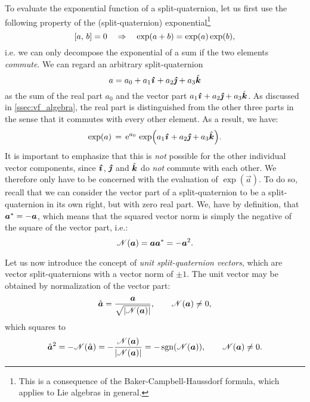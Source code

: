 To evaluate the exponential function of a split-quaternion, let us first use the following property of the (split-quaternion) exponential\footnote{This is a consequence of the Baker-Campbell-Haussdorf formula, which applies to Lie algebras in general.} \cite{Hall2013}
\begin{equation}
    \liebr{a}{b} = 0 \quad \Rightarrow \quad \exp(a + b) = \exp(a)\exp(b),
\end{equation}
i.e. we can only decompose the exponential of a sum if the two elements \emph{commute}. We can regard an arbitrary split-quaternion
\begin{equation}
     a = \quat{a_0}{a_1}{a_2}{a_3}
\end{equation}
as the sum of the real part \(a_0\) and the vector part \(\quatvec{a_1}{a_2}{a_3}\). As discussed in \cref{ssec:vf_algebra}, the real part is distinguished from the other three parts in the sense that it commutes with every other element. As a result, we have:
\begin{equation}
     \exp(a) \, = \,\ec^{a_0}\,\exp(\quatvec{a_1}{a_2}{a_3}).
\end{equation}
It is important to emphasize that this is \emph{not} possible for the other individual vector components, since $\quati$, $\quatj$ and $\quatk$ do \emph{not} commute with each other. We therefore only have to be concerned with the evaluation of \(\exp(\vec{a})\). To do so, recall that we can consider the vector part of a split-quaternion to be a split-quaternion in its own right, but with zero real part. We, have by definition, that \( \conj{\vec{a}} = -\vec{a} \), which means that the squared vector norm is simply the negative of the square of the vector part, i.e.:
\begin{equation}
     \mathscr{N}(\vec{a}) = \vec{a} \conj{\vec{a}} = -\vec{a}^2.
\end{equation}

Let us now introduce the concept of \emph{unit split-quaternion vectors}, which are vector split-quaternions with a vector norm of \(\pm 1\). The unit vector may be obtained by normalization of the vector part:
\begin{equation}
     \hat{\vec{a}} = \frac{\vec{a}}{\sqrt{\abs{\mathscr{N}(\vec{a})}}}, \qquad \mathscr{N}(\vec{a}) \neq 0,
\end{equation}
which squares to
\begin{equation}
     \hat{\vec{a}}^2 = - \mathscr{N}(\hat{\vec{a}}) 
                   = - \frac{\mathscr{N}(\vec{a})}{\abs{\mathscr{N}(\vec{a})}} 
                   = - \sgn(\mathscr{N}(\vec{a})), \qquad \mathscr{N}(\vec{a}) \neq 0.
\end{equation}

